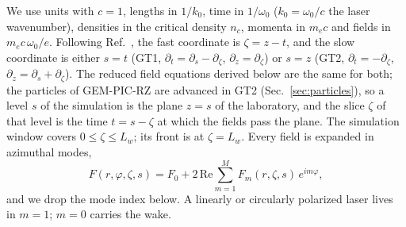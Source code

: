 \documentclass[preprint,12pt]{elsarticle}
\begin{document}
We use units with $c = 1$, lengths in $1/k_0$, time in $1/\omega_0$ ($k_0 = \omega_0/c$ the laser wavenumber), densities in the critical density $n_c$, momenta in $m_e c$ and fields in $m_e c\,\omega_0/e$. Following Ref.~\cite{GEMPIC}, the fast coordinate is $\zeta = z - t$, and the slow coordinate is either $s = t$ (GT1, $\partial_t = \partial_s - \partial_\zeta$, $\partial_z = \partial_\zeta$) or $s = z$ (GT2, $\partial_t = -\partial_\zeta$, $\partial_z = \partial_s + \partial_\zeta$). The reduced field equations derived below are the same for both; the particles of GEM-PIC-RZ are advanced in GT2 (Sec.~\ref{sec:particles}), so a level $s$ of the simulation is the plane $z = s$ of the laboratory, and the slice $\zeta$ of that level is the time $t = s - \zeta$ at which the fields pass the plane. The simulation window covers $0 \le \zeta \le L_w$; its front is at $\zeta = L_w$. Every field is expanded in azimuthal modes,
\begin{equation}
F(r,\varphi,\zeta,s) = F_0 + 2\,\mathrm{Re}\sum_{m=1}^{M} F_m(r,\zeta,s)\, e^{im\varphi},
\end{equation}
and we drop the mode index below. A linearly or circularly polarized laser lives in $m = 1$; $m = 0$ carries the wake.
\end{document}

